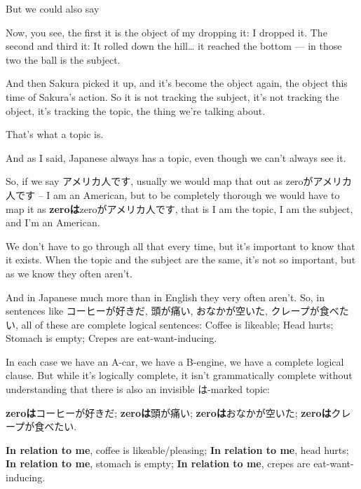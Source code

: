 But we could also say 

Now, you see, the first it is the object of my dropping it: I dropped it. The second and third it: It rolled down the hill\ldots{} it reached the bottom --- in those two the ball is the subject.

And then Sakura picked it up, and it's become the object again, the object this time of Sakura's action. So it is not tracking the subject, it's not tracking the object, it's tracking the topic, the thing we're talking about.

{}

That's what a topic is.

And as I said, Japanese always has a topic, even though we can't always see it.

So, if we say アメリカ人です, usually we would map that out as zeroがアメリカ人です -- I am an American, but to be completely thorough we would have to map it as {\bf zeroは}zeroがアメリカ人です, that is I am the topic, I am the subject, and I'm an American.

{}

We don't have to go through all that every time, but it's important to know that it exists. When the topic and the subject are the same, it's not so important, but as we know they often aren't.

And in Japanese much more than in English they very often aren't. So, in sentences like コーヒーが好きだ, 頭が痛い, おなかが空いた, クレープが食べたい, all of these are complete logical sentences: Coffee is likeable; Head hurts; Stomach is empty; Crepes are eat-want-inducing.

In each case we have an A-car, we have a B-engine, we have a complete logical clause. But while it's logically complete, it isn't grammatically complete without understanding that there is also an invisible は-marked topic:

{}

{\bf zeroは}コーヒーが好きだ; {\bf zeroは}頭が痛い;\crlf
{\bf zeroは}おなかが空いた; {\bf zeroは}クレープが食べたい.

{\bf In relation to me}, coffee is likeable/pleasing; {\bf In relation to me}, head hurts; {\bf In relation to me}, stomach is empty; {\bf In relation to me}, crepes are eat-want-inducing.

